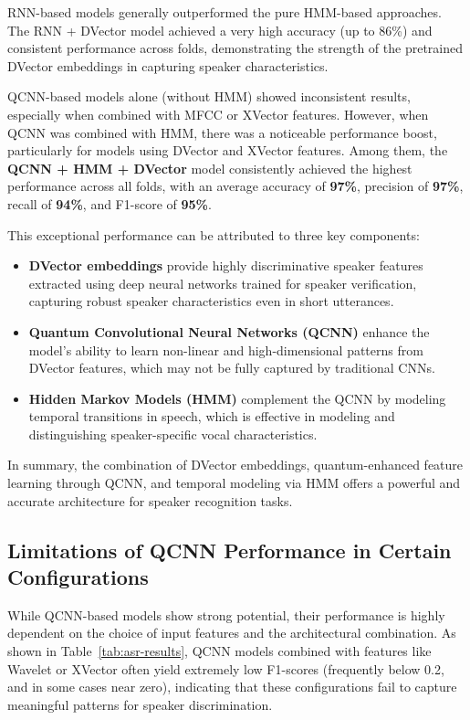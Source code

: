 \documentclass[conference]{IEEEtran}
\begin{document}
RNN-based models generally outperformed the pure HMM-based approaches. The RNN + DVector model achieved a very high accuracy (up to 86\%) and consistent performance across folds, demonstrating the strength of the pretrained DVector embeddings in capturing speaker characteristics.

QCNN-based models alone (without HMM) showed inconsistent results, especially when combined with MFCC or XVector features. However, when QCNN was combined with HMM, there was a noticeable performance boost, particularly for models using DVector and XVector features. Among them, the \textbf{QCNN + HMM + DVector} model consistently achieved the highest performance across all folds, with an average accuracy of \textbf{97\%}, precision of \textbf{97\%}, recall of \textbf{94\%}, and F1-score of \textbf{95\%}.

This exceptional performance can be attributed to three key components:
\begin{itemize}
    \item \textbf{DVector embeddings} provide highly discriminative speaker features extracted using deep neural networks trained for speaker verification, capturing robust speaker characteristics even in short utterances.
    \item \textbf{Quantum Convolutional Neural Networks (QCNN)} enhance the model’s ability to learn non-linear and high-dimensional patterns from DVector features, which may not be fully captured by traditional CNNs.
    \item \textbf{Hidden Markov Models (HMM)} complement the QCNN by modeling temporal transitions in speech, which is effective in modeling and distinguishing speaker-specific vocal characteristics.
\end{itemize}

In summary, the combination of DVector embeddings, quantum-enhanced feature learning through QCNN, and temporal modeling via HMM offers a powerful and accurate architecture for speaker recognition tasks.

\subsection{Limitations of QCNN Performance in Certain Configurations}

While QCNN-based models show strong potential, their performance is highly dependent on the choice of input features and the architectural combination. As shown in Table~\ref{tab:asr-results}, QCNN models combined with features like Wavelet or XVector often yield extremely low F1-scores (frequently below 0.2, and in some cases near zero), indicating that these configurations fail to capture meaningful patterns for speaker discrimination.
\end{document}
